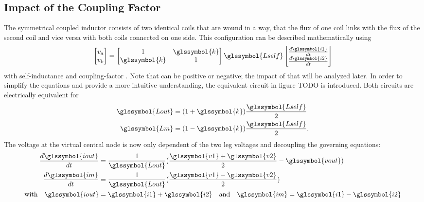 \documentclass{IPEC2026}
\newcommand{\sbl}[1]{\glssymbol{#1}}
\begin{document}
\subsection{Impact of the Coupling Factor}
The symmetrical coupled inductor consists of two identical coils that are wound in a way, that the flux of one coil links with the flux of the second coil and vice versa with both coils connected on one side. This configuration can be described mathematically using 
\begin{equation}
  \label{eq:StandardCoupling}
  \begin{bmatrix} v_\mathrm a \\ v_\mathrm b \end{bmatrix} = \begin{bmatrix} 1 & \sbl{k} \\ \sbl{k} & 1 \end{bmatrix} \sbl{Lself} \begin{bmatrix} \frac{d\sbl{i1}}{dt}  \\ \frac{d\sbl{i2}}{dt} \end{bmatrix}
\end{equation}
with self-inductance \sbl{Lself} and coupling-factor \sbl{k}. Note that \sbl{k} can be positive or negative; the impact of that will be analyzed later.
In order to simplify the equations and provide a more intuitive understanding, the equivalent circuit in figure TODO is introduced. Both circuits are electrically equivalent for
\begin{equation}
  \label{eq:LoutandLmfromk}
  \begin{aligned}
    \sbl{Lout} & = (1+\sbl{k})\frac{\sbl{Lself}}{2} \\
    \sbl{Lm} & = (1-\sbl{k})\frac{\sbl{Lself}}{2}.
  \end{aligned}
\end{equation}
The voltage at the virtual central node is now only dependent of the two leg voltages \sbl{v1} and \sbl{v2} decoupling the governing equations:
\begin{equation}
  \label{eq:TransformerModel}
  \begin{aligned}
    \frac{d\sbl{iout}}{dt} &= \frac{1}{\sbl{Lout}} (\frac{\sbl{v1} + \sbl{v2}}{2}-\sbl{vout}) \\
    \frac{d\sbl{im}}{dt} &= \frac{1}{\sbl{Lout}} (\frac{\sbl{v1} - \sbl{v2}}{2}) \\
    \text{with} \quad \sbl{iout} &= \sbl{i1} + \sbl{i2} \quad \text{and} \quad \sbl{im} = \sbl{i1} - \sbl{i2}
  \end{aligned}
\end{equation}
\end{document}
